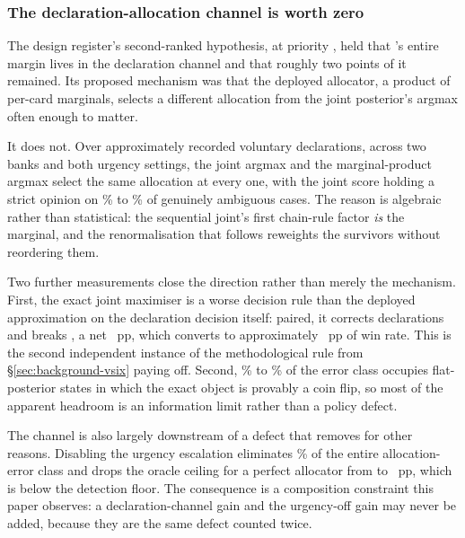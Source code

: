 \subsubsection{The declaration-allocation channel is worth zero}
\label{sec:development-alloc}

The design register's second-ranked hypothesis, at priority \vsevenLonePriority{}, held that
\vsix{}'s entire margin lives in the declaration channel and that roughly two points of it remained.
Its proposed mechanism was that the deployed allocator, a product of per-card marginals, selects a
different allocation from the joint posterior's argmax often enough to matter.

It does not. Over approximately \vsevenLoneDecls{} recorded voluntary declarations, across two banks
and both urgency settings, the joint argmax and the marginal-product argmax select the same allocation
at every one, with the joint score holding a strict opinion on
\vsevenLoneStrictLo\% to \vsevenLoneStrictHi\% of genuinely ambiguous cases. The reason is algebraic
rather than statistical: the sequential joint's first chain-rule factor \emph{is} the marginal, and
the renormalisation that follows reweights the survivors without reordering them.

Two further measurements close the direction rather than merely the mechanism. First, the exact joint
maximiser is a worse decision rule than the deployed approximation on the declaration decision itself:
paired, it corrects \vsevenJointFixed{} declarations and breaks \vsevenJointBroken{}, a net
\vsevenJointWorseNet{}~pp, which converts to approximately \vsevenJointWorseWin{}~pp of win rate. This
is the second independent instance of the methodological rule from \S\ref{sec:background-vsix} paying
off. Second, \vsevenJointFlatLo\% to \vsevenJointFlatHi\% of the error class occupies flat-posterior
states in which the exact object is provably a coin flip, so most of the apparent headroom is an
information limit rather than a policy defect.

The channel is also largely downstream of a defect that \sestina{} removes for other reasons.
Disabling the urgency escalation eliminates \vsevenLoneUrgencyShare\% of the entire allocation-error
class and drops the oracle ceiling for a perfect allocator from \vsevenLoneCeilingBefore{} to
\vsevenLoneCeilingAfter{}~pp, which is below the detection floor. The consequence is a composition
constraint this paper observes: a declaration-channel gain and the urgency-off gain may never be
added, because they are the same defect counted twice.

